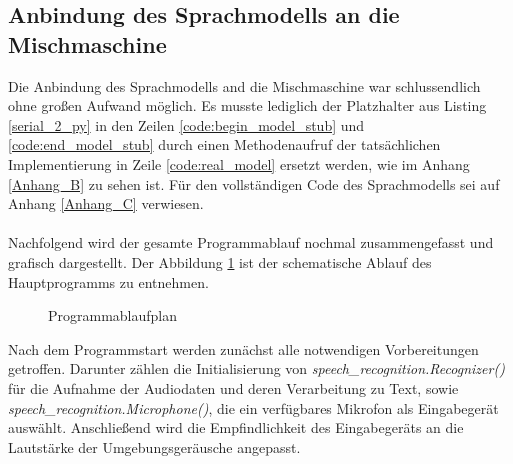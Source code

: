 \subsection{Anbindung des Sprachmodells an die Mischmaschine}
Die Anbindung des Sprachmodells and die Mischmaschine war schlussendlich ohne großen Aufwand möglich. Es musste lediglich der Platzhalter aus Listing \ref{serial_2_py} in den Zeilen \ref{code:begin_model_stub} und \ref{code:end_model_stub} durch einen Methodenaufruf der tatsächlichen Implementierung in Zeile \ref{code:real_model} ersetzt werden, wie im Anhang \ref{Anhang_B} zu sehen ist. Für den vollständigen Code des Sprachmodells sei auf Anhang \ref{Anhang_C} verwiesen.\\\\
Nachfolgend wird der gesamte Programmablauf nochmal zusammengefasst und grafisch dargestellt. Der Abbildung \ref{img:Programmablaufplan} ist der schematische Ablauf des Hauptprogramms zu entnehmen.
\begin{figure}[H]
    \centering
    \caption{Programmablaufplan}
    \label{img:Programmablaufplan}
\end{figure}
\noindent
Nach dem Programmstart werden zunächst alle notwendigen Vorbereitungen getroffen. Darunter zählen die Initialisierung von \textit{speech\_recognition.Recognizer()} für die Aufnahme der Audiodaten und deren Verarbeitung zu Text, sowie \textit{speech\_recognition.Microphone()}, die ein verfügbares Mikrofon als Eingabegerät auswählt. Anschließend wird die Empfindlichkeit des Eingabegeräts an die Lautstärke der Umgebungsgeräusche angepasst.\\\\
